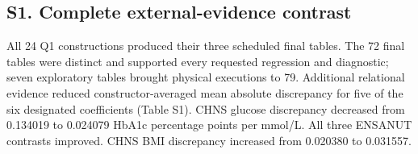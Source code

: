 \documentclass[11pt,letterpaper]{article}
\begin{document}
\subsection*{S1. Complete external-evidence contrast}

All 24 Q1 constructions produced their three scheduled final tables. The 72 final tables were distinct and supported every requested regression and diagnostic; seven exploratory tables brought physical executions to 79. Additional relational evidence reduced constructor-averaged mean absolute discrepancy for five of the six designated coefficients (Table S1). CHNS glucose discrepancy decreased from 0.134019 to 0.024079 HbA1c percentage points per mmol/\allowbreak{}L. All three ENSANUT contrasts improved. CHNS BMI discrepancy increased from 0.020380 to 0.031557.


\begingroup

\small

\renewcommand{\arraystretch}{1.22}
\end{document}
